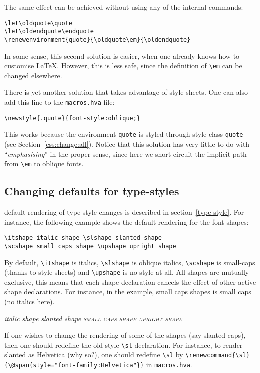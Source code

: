 The same effect can be achieved without using any of the internal
commands:
\begin{verbatim}
\let\oldquote\quote
\let\oldendquote\endquote
\renewenvironment{quote}{\oldquote\em}{\oldendquote}
\end{verbatim}
In some sense, this second 
solution is easier, when one already knows
how to customise \LaTeX{}. However, this is less safe, since the definition of
\verb+\em+ can be changed elsewhere.

There is yet another solution that takes advantage of style sheets.
One can also add this line to the \texttt{macros.hva} file:
\begin{verbatim}
\newstyle{.quote}{font-style:oblique;}
\end{verbatim}
This works because the environment \texttt{quote} is styled through
style class \texttt{quote} (see Section~\ref{css:change:all}).
Notice that this solution has very little to do with
``\emph{emphasising}'' in the proper sense, since here we
short-circuit the implicit path from \verb+\em+ to oblique fonts.


\subsection{Changing defaults for type-styles}\label{customize-style}
\hevea{} default rendering of type style changes is described in
section~\ref{type-style}.
For instance, the following example shows the default rendering
for the font shapes:
\begin{verbatim}
\itshape italic shape \slshape slanted shape
\scshape small caps shape \upshape upright shape
\end{verbatim}
By default, \verb+\itshape+ is italics, \verb+\slshape+ is oblique
italics, \verb+\scshape+ is small-caps (thanks to style sheets) and \verb+\upshape+ is no style at all.
All shapes are mutually exclusive, this means that each shape
declaration cancels the effect of other active shape declarations.
For instance, in the example, small caps shapes is small caps (no italics here).
\begin{htmlonly}
\begin{htmlout}
\itshape italic shape \slshape slanted shape
\scshape small caps shape \upshape upright shape
\end{htmlout}
\end{htmlonly}

If one wishes to change the rendering of some of the shapes (say slanted
caps), then one should redefine the old-style \verb+\sl+ declaration.
For instance, to render slanted as Helvetica (why so?), one should
redefine \verb+\sl+ by \verb+\renewcommand{\sl}{\@span{style="font-family:Helvetica"}}+ in
\texttt{macros.hva}.


